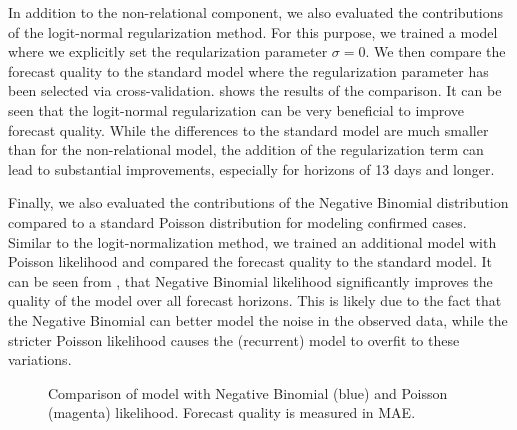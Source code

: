 In addition to the non-relational component, we also evaluated the contributions
of the logit-normal regularization method. For this purpose, we trained a model
where we explicitly set the reqularization parameter \(\sigma = 0\). We then
compare the forecast quality to the standard model where the regularization
parameter has been selected via cross-validation. 
shows the results of the comparison. It can be seen that the logit-normal
regularization can be very beneficial to improve forecast quality. While the
differences to the standard model are much smaller than for the non-relational
model, the addition of the regularization term can lead to substantial
improvements, especially for horizons of 13 days and longer.

Finally, we also evaluated the contributions of the Negative Binomial
distribution compared to a standard Poisson distribution for modeling confirmed
cases. Similar to the logit-normalization method, we trained an additional model
with Poisson likelihood and compared the forecast quality to the standard model.
It can be seen from , that Negative Binomial likelihood
significantly improves the quality of the model over all forecast horizons. This
is likely due to the fact that the Negative Binomial can better model the noise
in the observed data, while the stricter Poisson likelihood causes the
(recurrent) model to overfit to these variations.

\begin{figure}[t]
\centering
\caption{\label{fig:mae-covidhub-loss}Comparison of \bAR model with Negative Binomial (blue) and Poisson (magenta) likelihood. Forecast quality is measured in MAE.}
\end{figure}


